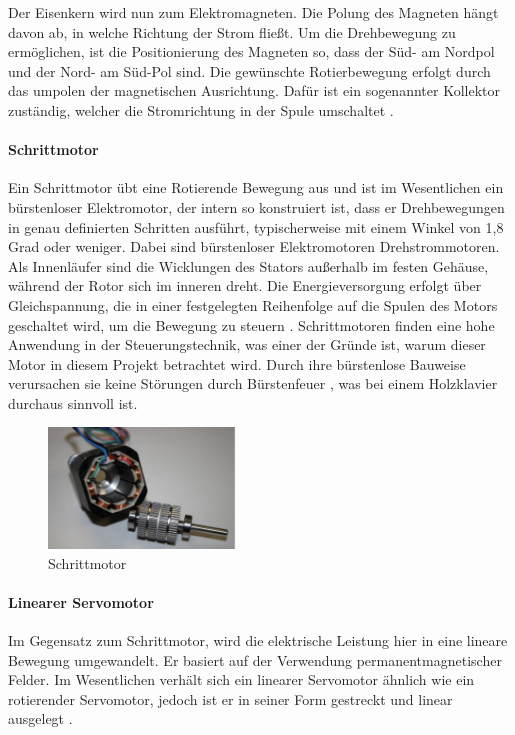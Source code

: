 Der Eisenkern wird nun zum Elektromagneten. Die Polung des Magneten hängt davon ab, in welche Richtung der Strom fließt.
Um die Drehbewegung zu ermöglichen, ist die Positionierung des Magneten so, dass der Süd- am Nordpol und der Nord- am Süd-Pol
sind. Die gewünschte Rotierbewegung erfolgt durch das umpolen der magnetischen Ausrichtung.
Dafür ist ein sogenannter Kollektor zuständig, welcher die Stromrichtung in der Spule umschaltet \cite*[vgl.][]{Aufbau.Elektromotoren}.


\paragraph{Schrittmotor}

Ein Schrittmotor übt eine Rotierende Bewegung aus und ist im Wesentlichen ein bürstenloser Elektromotor, der intern so konstruiert ist,
dass er Drehbewegungen in genau definierten Schritten ausführt, typischerweise mit einem Winkel von 1,8 Grad oder weniger.
Dabei sind bürstenloser Elektromotoren Drehstrommotoren. Als Innenläufer sind die Wicklungen des Stators außerhalb im festen Gehäuse,
während der Rotor sich im inneren dreht.
Die Energieversorgung erfolgt über Gleichspannung, die in einer festgelegten Reihenfolge auf die Spulen des Motors
geschaltet wird, um die Bewegung zu steuern \cite*[vgl.][]{Aufbau.Elektromotoren}.
Schrittmotoren finden eine hohe Anwendung in der Steuerungstechnik, was einer der Gründe ist, warum dieser Motor in diesem
Projekt betrachtet wird. Durch ihre bürstenlose Bauweise verursachen sie keine Störungen durch Bürstenfeuer \cite*[vgl.][]{Aufbau.Elektromotoren}, was bei einem
Holzklavier durchaus sinnvoll ist.

\begin{figure}[htbp]
	\centering
	\includegraphics[width=5cm]{img/Schrittmotor}
	\caption{Schrittmotor \cite*{Aufbau.Elektromotoren}}
	\label{fig:Linearmotor}
\end{figure}

\paragraph{Linearer Servomotor}
Im Gegensatz zum Schrittmotor, wird die elektrische Leistung hier in eine lineare Bewegung umgewandelt. Er basiert auf der
Verwendung permanentmagnetischer Felder. Im Wesentlichen
verhält sich ein linearer Servomotor ähnlich wie ein rotierender Servomotor, jedoch ist er in seiner Form gestreckt und linear ausgelegt \cite*[vgl.][]{Linearer.Servo}.

